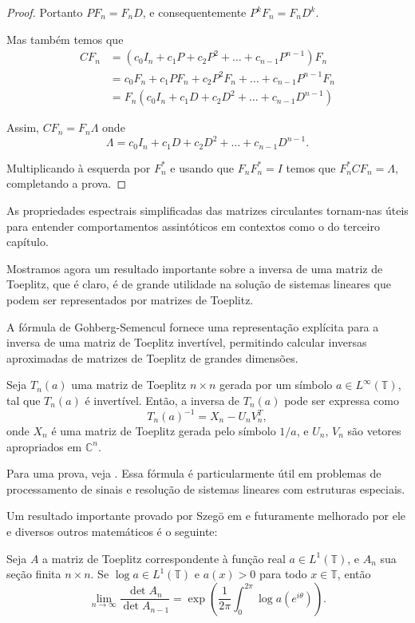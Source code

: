 \begin{proof}
    Portanto $P F_n = F_n D$, e consequentemente $P^kF_n = F_nD^k$.

    Mas também temos que \begin{align*}
        C F_n &= \left( c_0 I_n + c_1 P + c_2 P^2 + \dots + c_{n-1} P^{n-1} \right) F_n \\
        &= c_0 F_n + c_1 P F_n + c_2 P^2 F_n + \dots + c_{n-1} P^{n-1} F_n \\
        &= F_n \left( c_0 I_n + c_1 D + c_2 D^2 + \dots + c_{n-1} D^{n-1} \right)
    \end{align*}

    Assim, $C F_n = F_n \Lambda$ onde \[\Lambda = c_0 I_n + c_1 D + c_2 D^2 + \dots + c_{n-1} D^{n-1}.\]
    
    Multiplicando à esquerda por $F_n^*$ e usando que $F_n F_n^* = I$ temos que $F_n^* C F_n = \Lambda$, completando a prova.
\end{proof}

As propriedades espectrais simplificadas das matrizes circulantes tornam-nas úteis para entender comportamentos assintóticos em contextos como o do terceiro capítulo.

Mostramos agora um resultado importante sobre a inversa de uma matriz de Toeplitz, que é claro, é de grande utilidade na solução de sistemas lineares que podem ser representados por matrizes de Toeplitz.

A fórmula de Gohberg-Semencul fornece uma representação explícita para a inversa de uma matriz de Toeplitz invertível, permitindo calcular inversas aproximadas de matrizes de Toeplitz de grandes dimensões.
\begin{theorem*}
  Seja $ T_n(a)$ uma matriz de Toeplitz $ n \times n$ gerada por um símbolo $ a \in L^\infty(\mathbb{T})$, tal que $ T_n(a)$ é invertível. Então, a inversa de $ T_n(a)$ pode ser expressa como
  \[
    T_n(a)^{-1} = X_n - U_n V_n^T,
  \]
  onde $ X_n$ é uma matriz de Toeplitz gerada pelo símbolo $1 / a$, e $ U_n$, $ V_n$ são vetores apropriados em $ \mathbb{C}^n$.
\end{theorem*}
Para uma prova, veja \cite{gohberg1972}.
Essa fórmula é particularmente útil em problemas de processamento de sinais e resolução de sistemas lineares com estruturas especiais.

Um resultado importante provado por Szegö em \cite{szego1915} e futuramente melhorado por ele e diversos outros matemáticos é o seguinte:
\begin{theorem*}
  Seja $A$ a matriz de Toeplitz correspondente à função real $a \in L^1(\mathbb{T})$, e $A_n$ sua seção finita $n \times n$. Se $\log a \in L^1(\mathbb{T})$ e $a(x) > 0$ para todo $x \in \mathbb{T}$, então \[\lim_{n\to \infty} \frac{\det A_n}{\det A_{n-1}} = \exp\left(\frac{1}{2\pi} \int_{0}^{2\pi} \log a\left(e^{i\theta}\right) \right)\text{.}\]
\end{theorem*}


